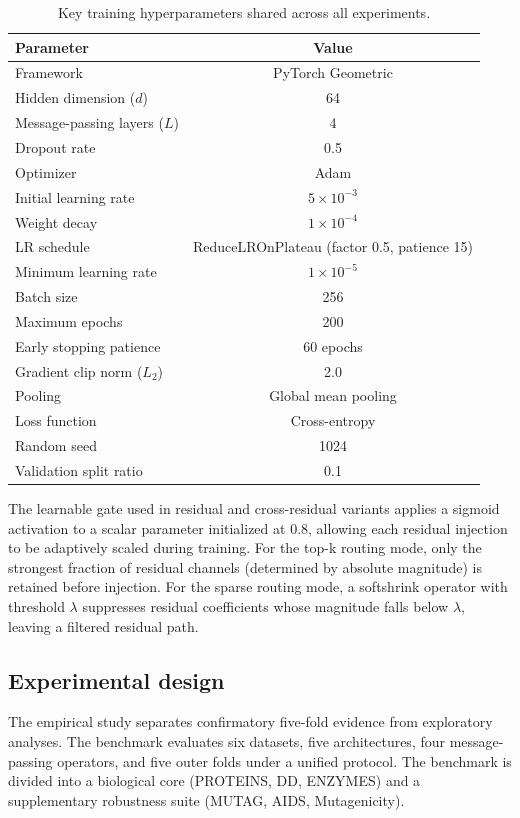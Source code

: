 \begin{table}[h]
\centering
\small
\caption{Key training hyperparameters shared across all experiments.}
\label{tab:hyperparams}
\begin{tabular}{l c}
\toprule
Parameter & Value \\
\midrule
Framework & PyTorch Geometric \\
Hidden dimension ($d$) & 64 \\
Message-passing layers ($L$) & 4 \\
Dropout rate & 0.5 \\
Optimizer & Adam \\
Initial learning rate & $5\times10^{-3}$ \\
Weight decay & $1\times10^{-4}$ \\
LR schedule & ReduceLROnPlateau (factor 0.5, patience 15) \\
Minimum learning rate & $1\times10^{-5}$ \\
Batch size & 256 \\
Maximum epochs & 200 \\
Early stopping patience & 60 epochs \\
Gradient clip norm ($L_2$) & 2.0 \\
Pooling & Global mean pooling \\
Loss function & Cross-entropy \\
Random seed & 1024 \\
Validation split ratio & 0.1 \\
\bottomrule
\end{tabular}
\end{table}

The learnable gate used in residual and cross-residual variants applies a sigmoid activation to a scalar parameter initialized at $0.8$, allowing each residual injection to be adaptively scaled during training. For the top-k routing mode, only the strongest fraction of residual channels (determined by absolute magnitude) is retained before injection. For the sparse routing mode, a softshrink operator with threshold $\lambda$ suppresses residual coefficients whose magnitude falls below $\lambda$, leaving a filtered residual path.

\subsection{Experimental design}

The empirical study separates confirmatory five-fold evidence from exploratory analyses. The benchmark evaluates six datasets, five architectures, four message-passing operators, and five outer folds under a unified protocol. The benchmark is divided into a biological core (PROTEINS, DD, ENZYMES) and a supplementary robustness suite (MUTAG, AIDS, Mutagenicity).

